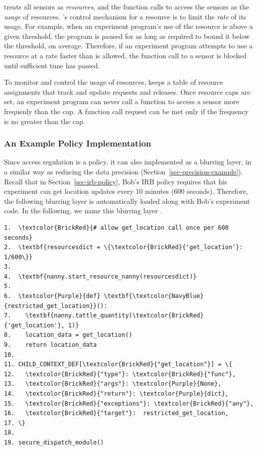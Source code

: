  treats all sensors as \textit{resources}, and the function calls to 
access the sensors as the \textit{usage} of resources. 's control 
mechanism for a resource is to limit the \textit{rate} of its usage. For example, 
when an 
experiment program's use of the resource is above a given threshold, the 
program is paused for as long as required to bound it below the
threshold, on average. Therefore, if an experiment program attempts to 
use a resource at a rate faster than is allowed, the function 
call to a sensor is blocked until sufficient time has passed. 

To monitor and control the usage of resources,  keeps a 
table of resource assignments that track and update requests and releases. 
Once resource caps are set, an experiment program can never call a 
function to access a sensor more frequenly than the cap. A function call 
request can be met only if the frequency is no greater than the cap. 

\subsubsection{An Example Policy Implementation}\label{sec-rate-example}

Since access regulation is a policy, it can also implemented as a blurring layer, 
in a similar way as reducing the data precision (Section~\ref{sec-precision-example}).
Recall that in Section~\ref{sec-irb-policy}, Bob's IRB policy requires that
his experiment can get location updates every 10 minutes (600 seconds). 
Therefore, the following blurring layer is automatically loaded along with 
Bob's experiment code. In the following, we name this blurring layer 
.

\begin{Verbatim}
1.  \textcolor{BrickRed}{# allow get_location call once per 600 seconds}
2.  \textbf{resourcesdict = \{\textcolor{BrickRed}{'get_location'}: 1/600\}} 
3.
4.  \textbf{nanny.start_resource_nanny(resourcesdict)}
5.
6.  \textcolor{Purple}{def} \textbf{\textcolor{NavyBlue}{restricted_get_location}}():
7.    \textbf{nanny.tattle_quantity(\textcolor{BrickRed}{'get_location'}, 1)}
8.    location_data = get_location()
9.    return location_data
10.
11. CHILD_CONTEXT_DEF[\textcolor{BrickRed}{"get_location"}] = \{
12.   \textcolor{BrickRed}{"type"}: \textcolor{BrickRed}{"func"},
13.   \textcolor{BrickRed}{"args"}: \textcolor{Purple}{None},
14.   \textcolor{BrickRed}{"return"}: \textcolor{Purple}{dict},
15.   \textcolor{BrickRed}{"exceptions"}: \textcolor{BrickRed}{"any"},
16.   \textcolor{BrickRed}{"target"}:  restricted_get_location,
17. \}
18. 
19. secure_dispatch_module()
\end{Verbatim}

